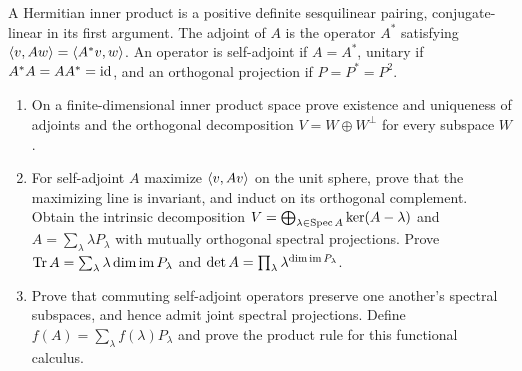 \begin{exercise}
A Hermitian inner product is a positive definite sesquilinear pairing,
conjugate-linear in its first argument. The adjoint of $A$ is the
operator $A^*$ satisfying $\left\langle v,Aw\right\rangle=\left\langle A^*v,w\right\rangle$.
An operator is self-adjoint if $A=A^*$, unitary if $A^*A=AA^*=\operatorname{id}$,
and an orthogonal projection if $P=P^*=P^2$.
\begin{enumerate}[label=(\alph*)]
\item On a finite-dimensional inner product space prove existence
and uniqueness of adjoints and the orthogonal decomposition
$V=W\oplus W^\perp$ for every subspace $W$.
\item For self-adjoint $A$ maximize $\left\langle v,Av\right\rangle$ on the unit
sphere, prove that the maximizing line is invariant, and induct on
its orthogonal complement. Obtain the intrinsic decomposition
$V=\bigoplus_{\lambda\in\operatorname{Spec} A}\ker(A-\lambda)$ and
$A=\sum_\lambda\lambda P_\lambda$ with mutually orthogonal
spectral projections. Prove $\operatorname{Tr} A=\sum_\lambda\lambda\dim\operatorname{im} P_\lambda$
and $\det A=\prod_\lambda\lambda^{\dim\operatorname{im} P_\lambda}$.
\item Prove that commuting self-adjoint operators preserve one
another's spectral subspaces, and hence admit joint spectral
projections. Define $f(A)=\sum_\lambda f(\lambda)P_\lambda$
and prove the product rule for this functional calculus.
\end{enumerate}
\end{exercise}

